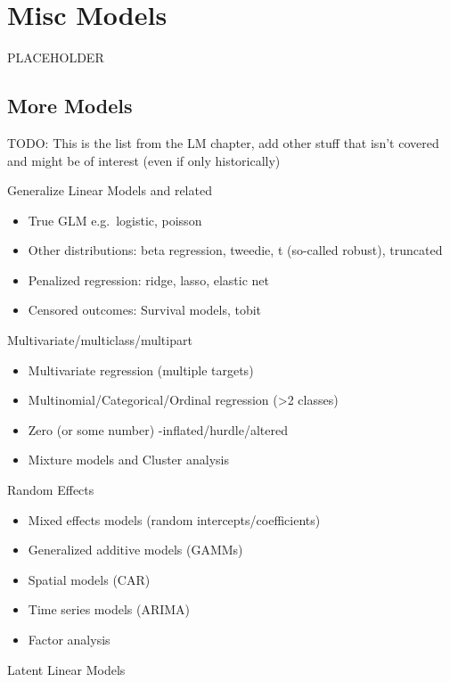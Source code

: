 \documentclass[
  letterpaper,
]{krantz}
\providecommand{\tightlist}{%
  \setlength{\itemsep}{0pt}\setlength{\parskip}{0pt}}\usepackage{longtable,booktabs,array}
\begin{document}
\chapter{Misc Models}\label{misc-models}

PLACEHOLDER

\section{More Models}\label{more-models}

TODO: This is the list from the LM chapter, add other stuff that isn't
covered and might be of interest (even if only historically)

Generalize Linear Models and related

\begin{itemize}
\tightlist
\item
  True GLM e.g.~logistic, poisson
\item
  Other distributions: beta regression, tweedie, t (so-called robust),
  truncated
\item
  Penalized regression: ridge, lasso, elastic net
\item
  Censored outcomes: Survival models, tobit
\end{itemize}

Multivariate/multiclass/multipart

\begin{itemize}
\tightlist
\item
  Multivariate regression (multiple targets)
\item
  Multinomial/Categorical/Ordinal regression (\textgreater2 classes)
\item
  Zero (or some number) -inflated/hurdle/altered
\item
  Mixture models and Cluster analysis
\end{itemize}

Random Effects

\begin{itemize}
\tightlist
\item
  Mixed effects models (random intercepts/coefficients)
\item
  Generalized additive models (GAMMs)
\item
  Spatial models (CAR)
\item
  Time series models (ARIMA)
\item
  Factor analysis
\end{itemize}

Latent Linear Models
\end{document}
